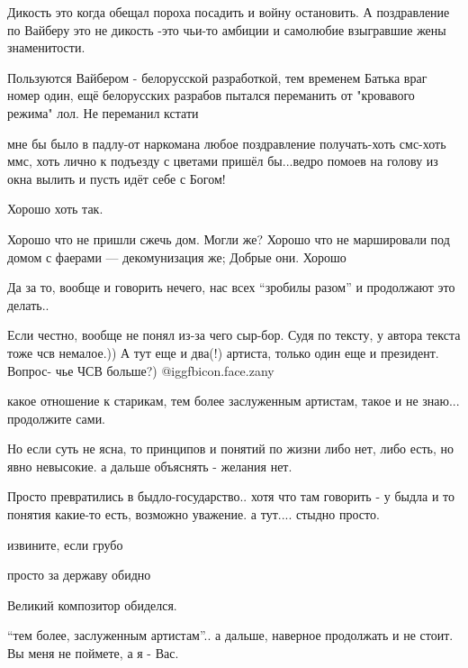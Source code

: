 \begin{multicols}{2}

Дикость это когда обещал пороха посадить и войну остановить. А поздравление по
Вайберу это не дикость -это чьи-то амбиции и самолюбие взыгравшие жены
знаменитости.


Пользуются Вайбером - белорусской разработкой, тем временем Батька враг номер
один, ещё белорусских разрабов пытался переманить от "кровавого режима" лол. Не
переманил кстати


мне бы было в падлу-от наркомана любое поздравление получать-хоть смс-хоть ммс,
хоть лично к подъезду с цветами пришёл бы...ведро помоев на голову из окна
вылить и пусть идёт себе  с Богом!

Хорошо хоть так. 

Хорошо что не пришли сжечь дом. Могли же?
Хорошо что не маршировали под домом с фаерами — декомунизация же; 
Добрые они. Хорошо

Да за то, вообще и говорить нечего, нас всех \enquote{зробилы разом} и продолжают это делать..


Если честно, вообще не понял из-за чего сыр-бор. Судя по тексту, у автора
текста тоже чсв немалое.)) А тут еще и два(!) артиста, только один еще и
президент. Вопрос- чье ЧСВ больше?)  @igg{fbicon.face.zany} 


какое отношение к старикам, тем более заслуженным артистам, такое и не знаю...
продолжите сами. 

Но если суть не ясна, то принципов и понятий по жизни либо нет, либо есть, но
явно невысокие.  а дальше объяснять - желания нет.


Просто превратились в быдло-государство.. хотя что там говорить - у быдла и то
понятия какие-то есть, возможно уважение. а тут.... стыдно просто.

извините, если грубо

просто за державу обидно

Великий композитор обиделся.


\enquote{тем более, заслуженным артистам}.. а дальше, наверное продолжать и не стоит.
Вы меня не поймете, а я - Вас.


\end{multicols}
